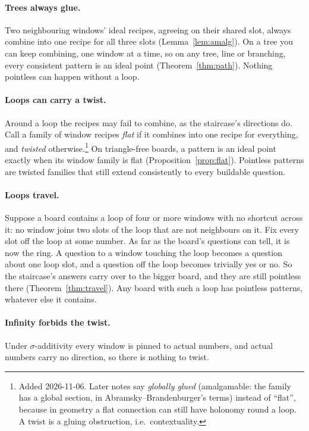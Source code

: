 \documentclass[11pt]{article}
\theoremstyle{plain}
\theoremstyle{definition}
\begin{document}
\paragraph{Trees always glue.} Two neighbouring windows' ideal recipes, agreeing
on their shared slot, always combine into one recipe for all three slots
(Lemma~\ref{lem:amalg}). On a tree you can keep combining, one window at a time,
so on any tree, line or branching, every consistent pattern is an ideal point
(Theorem~\ref{thm:path}). Nothing pointless can happen without a loop.

\paragraph{Loops can carry a twist.} Around a loop the recipes may fail to
combine, as the staircase's directions do. Call a family of window recipes
\emph{flat} if it combines into one recipe for everything, and \emph{twisted}
otherwise.\footnote{Added 2026-11-06. Later notes say \emph{globally glued} (amalgamable: the family has a global section, in Abramsky--Brandenburger's terms) instead of ``flat'', because in geometry a flat connection can still have holonomy round a loop. A twist is a gluing obstruction, i.e.\ contextuality.} On triangle-free boards, a pattern is an ideal point exactly when its
window family is flat (Proposition~\ref{prop:flat}). Pointless patterns are
twisted families that still extend consistently to every buildable question.

\paragraph{Loops travel.} Suppose a board contains a loop of four or more windows
with no shortcut across it: no window joins two slots of the loop that are not
neighbours on it. Fix every slot off the loop at some number. As far as the
board's questions can tell, it is now the ring. A question to a window touching
the loop becomes a question about one loop slot, and a question off the loop
becomes trivially yes or no. So the staircase's answers carry over to the bigger
board, and they are still pointless there (Theorem~\ref{thm:travel}). Any board
with such a loop has pointless patterns, whatever else it contains.

\paragraph{Infinity forbids the twist.} Under $\sigma$-additivity every window is
pinned to actual numbers, and actual numbers carry no direction, so there is
nothing to twist.
\end{document}
